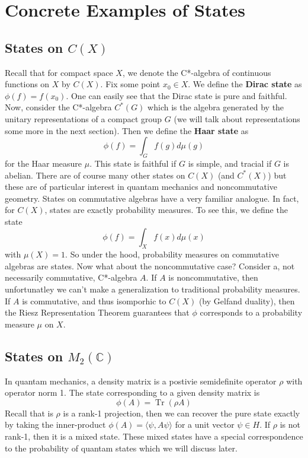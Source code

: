 \section{Concrete Examples of States}
\subsection{States on \( C(X) \)}
Recall that for compact space $X$, we denote the C*-algebra of continuous functions
on $X$ by $C(X)$. Fix some point $x_0 \in X$. We define the \textbf{Dirac state} as
$\phi(f) = f(x_0)$. One can easily see that the Dirac state is pure and faithful.
Now, consider the C*-algebra $C^*(G)$ which is the algebra generated by the unitary representations
of a compact group $G$ (we will talk about representations some more in the next section).
Then we define the \textbf{Haar state} as
\begin{equation*}
    \phi(f) = \int_G f(g)d\mu (g)
\end{equation*}
for the Haar measure $\mu$. This state is faithful if $G$ is simple, and tracial if
$G$ is abelian. There are of course many other states on $C(X)$ (and $C^*(X)$) but
these are of particular interest in quantam mechanics and noncommutative geometry.
States on commutative algebras have a very familiar analogue. In fact, for $C(X)$,
states are exactly probability measures. To see this, we define the state
\begin{equation*}
    \phi(f) = \int_X f(x) d \mu(x)   
\end{equation*}
with $\mu(X) = 1$. So under the hood, probability measures on commutative algebras
are states. Now what about the noncommutative case? Consider a, not necessarily commutative,
C*-algebra $A$. If $A$ is noncommutative, then unfortunatley we can't make a generalization
to traditional probability measures. If $A$ is commutative, and thus isomporhic to
$C(X)$ (by Gelfand duality), then the Riesz Representation Theorem guarantees that $\phi$ corresponds
to a probability measure $\mu$ on $X$.


\subsection{States on \( M_2(\mathbb{C}) \)}
In quantam mechanics, a density matrix is a postivie semidefinite operator $\rho$
with operator norm 1. The state corresponding to a given density matrix is
\begin{equation*}
    \phi(A) = \operatorname{Tr}(\rho A)
\end{equation*}
Recall that is $\rho$ is a rank-1 projection, then we can recover the pure state exactly
by taking the inner-product $\phi(A) = \langle \psi, A\psi \rangle$ for a unit vector
$\psi \in H$. If $\rho$ is not rank-1, then it is a mixed state. These mixed states
have a special correspondence to the probability of quantam states which we will
discuss later.

